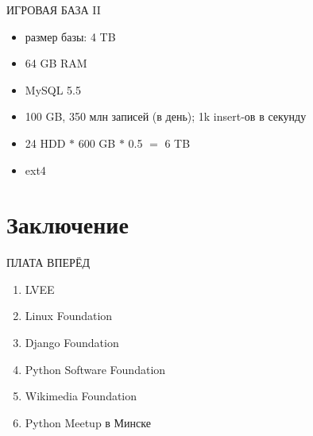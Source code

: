 \documentclass[aspectratio=169]{beamer}
\begin{document}
\begin{frame}{ИГРОВАЯ БАЗА II}
    \begin{itemize}
        \item размер базы: 4 TB
        \item 64 GB RAM
        \item MySQL 5.5
        \item 100 GB, 350 млн записей (в день); 1k insert-ов в секунду
        \item 24 HDD $*$ 600 GB $*$ 0.5 $=$ 6 TB
        \item ext4
    \end{itemize}
\end{frame}

\section{Заключение}
{
\begin{frame}[plain]{}
\end{frame}
}

\begin{frame}{ПЛАТА ВПЕРЁД}
    \begin{enumerate}
        \item LVEE
        \item Linux Foundation
        \item Django Foundation
        \item Python Software Foundation
        \item Wikimedia Foundation
        \item Python Meetup в Минске
    \end{enumerate}
\end{frame}
\end{document}
